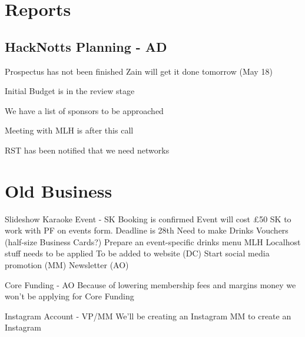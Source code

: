 \documentclass[11pt,hacksoc]{meetingmins}
\begin{document}
\maketitle

\section{Reports}

\subsection{HackNotts Planning - AD}
\begin{hiddensubitems}
  \item Prospectus has not been finished
    \subitem Zain will get it done tomorrow (May 18)
  \item Initial Budget is in the review stage
  \item We have a list of sponsors to be approached
  \item Meeting with MLH is after this call
  \item RST has been notified that we need networks
\end{hiddensubitems}

\section{Old Business}
\begin{items}
  \item Slideshow Karaoke Event - SK
    \subitem Booking is confirmed
    \subitem Event will cost \pounds50
    \subitem SK to work with PF on events form. Deadline is 28th
    \subitem Need to make Drinks Vouchers (half-size Business Cards?)
    \subitem Prepare an event-specific drinks menu
    \subitem MLH Localhost stuff needs to be applied
    \subitem To be added to website (DC)
    \subitem Start social media promotion (MM)
    \subitem Newsletter (AO)
  \item Core Funding - AO
    \subitem Because of lowering membership fees and margins money we won't be applying for Core Funding
  \item Instagram Account - VP/MM
    \subitem We'll be creating an Instagram
    \subitem MM to create an Instagram
\end{items}
\end{document}

